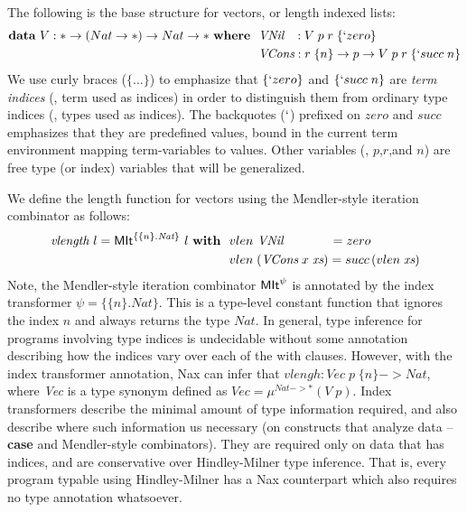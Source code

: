 The following is the base structure for vectors, or length indexed lists:
\begin{align*}
\textbf{data}~V : * -> (Nat -> *) -> Nat -> * ~\textbf{where}~~
& \textit{VNil}~~\, : V\;p\;r\;\{`zero\} \\
& \textit{VCons}    : r\;\{n\} -> p -> V\;p\;r\;\{`succ\;n\}
\end{align*}
We use curly braces ($\{\dots\}$) to emphasize that $\{`zero\}$ and
$\{`succ\;n\}$ are \emph{term indices} (\ie, term used as indices) in order to
distinguish them from ordinary type indices (\ie, types used as indices).
The backquotes ($`$) prefixed on $zero$ and $succ$ emphasizes that
they are predefined values, bound in the current term environment
mapping term-variables to values. Other variables (\eg, $p$,$r$,and $n$)
are free type (or index) variables that will be generalized.

We define the length function for vectors using the Mendler-style
iteration combinator as follows:
\begin{align*}
\textit{vlength}~l = \textsf{MIt}^{\{\{n\} . \textit{Nat}\}}~l~\textbf{with}~~
&  vlen ~\textit{VNil}~~~~~~~~~~~ = zero \\
&  vlen \;(\textit{VCons}\;x\;\textit{xs}) = succ\,(vlen\;\textit{xs})
\end{align*}
Note, the Mendler-style iteration combinator $\textsf{MIt}^\psi$ is annotated by
the index transformer $\psi = \{\{n\} . \textit{Nat}\}$. This is
a type-level constant function that ignores the index $n$ and always returns
the type $\textit{Nat}$. In general, type inference for programs involving
type indices is undecidable without some annotation describing how the indices
vary over each of the \textsf{with} clauses. However, with the
index transformer annotation, Nax can infer that
$vlengh : \textit{Vec}\;p\;\{n\} -> \textit{Nat}$,
where \textit{Vec} is a type synonym defined as
$\textit{Vec} = \mu^{\textit{Nat} -> *}(V\;p)$.
Index transformers describe the minimal amount of type information required,
and also describe where such information us necessary (on constructs that
analyze data -- \textbf{case} and Mendler-style combinators).
They are required only on data that has indices, and are conservative over
Hindley-Milner type inference. That is, every program typable using
Hindley-Milner has a Nax counterpart which also requires no type annotation
whatsoever.


